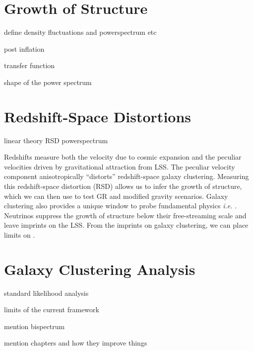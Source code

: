 \section{Growth of Structure}
\begin{enumerate}
{\item 
define density fluctuations and powerspectrum etc 
}
{\item 
post inflation 
}
{\item 
 transfer function 
 }
 {\item
 shape of the power spectrum
 }
\end{enumerate}

\section{Redshift-Space Distortions}
\begin{enumerate}
{\item 
{}
}
{\item 
linear theory RSD powerspectrum
}
\end{enumerate}


Redshifts measure both the velocity due to cosmic expansion and the peculiar velocities driven by gravitational attraction from LSS. 
The peculiar velocity component anisotropically ``distorts'' redshift-space galaxy clustering. 
Measuring this redshift-space distortion (RSD) allows us to infer the growth of structure, which we can then use to test GR and modified gravity scenarios. 
Galaxy clustering also provides a unique window to probe fundamental physics {\em i.e.} \mneut. 
Neutrinos suppress the growth of structure below their free-streaming scale and leave imprints on the LSS. 
From the imprints on galaxy clustering, we can place limits on \mneut. 

\section{Galaxy Clustering Analysis}%

\begin{enumerate}
{\item 
standard likelihood analysis 
}
{\item 
limits of the current framework
}
{\item 
mention bispectrum
}
{\item 
mention chapters and how they improve things
}
\end{enumerate}

